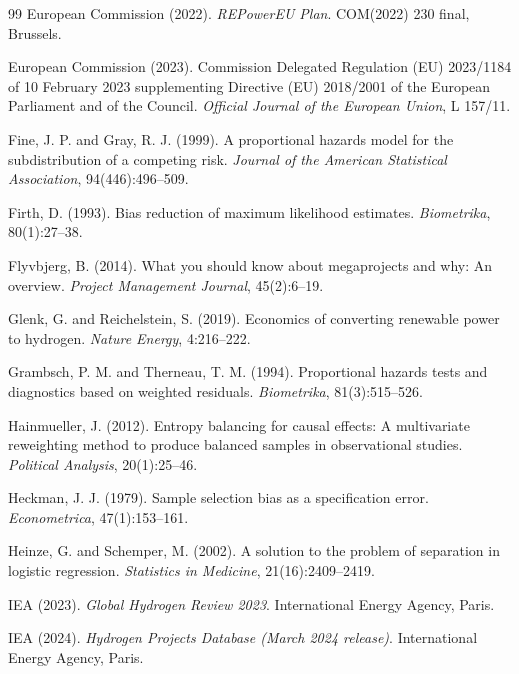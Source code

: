 \documentclass[review,authoryear,11pt]{elsarticle}
\begin{document}
\begin{thebibliography}{99}
European Commission (2022). \textit{REPowerEU Plan}. COM(2022) 230 final, Brussels.

European Commission (2023). Commission Delegated Regulation (EU) 2023/1184 of 10 February 2023 supplementing Directive (EU) 2018/2001 of the European Parliament and of the Council. \textit{Official Journal of the European Union}, L 157/11.

Fine, J. P. and Gray, R. J. (1999). A proportional hazards model for the subdistribution of a competing risk. \textit{Journal of the American Statistical Association}, 94(446):496--509.

Firth, D. (1993). Bias reduction of maximum likelihood estimates. \textit{Biometrika}, 80(1):27--38.

Flyvbjerg, B. (2014). What you should know about megaprojects and why: An overview. \textit{Project Management Journal}, 45(2):6--19.

Glenk, G. and Reichelstein, S. (2019). Economics of converting renewable power to hydrogen. \textit{Nature Energy}, 4:216--222.

Grambsch, P. M. and Therneau, T. M. (1994). Proportional hazards tests and diagnostics based on weighted residuals. \textit{Biometrika}, 81(3):515--526.

Hainmueller, J. (2012). Entropy balancing for causal effects: A multivariate reweighting method to produce balanced samples in observational studies. \textit{Political Analysis}, 20(1):25--46.

Heckman, J. J. (1979). Sample selection bias as a specification error. \textit{Econometrica}, 47(1):153--161.

Heinze, G. and Schemper, M. (2002). A solution to the problem of separation in logistic regression. \textit{Statistics in Medicine}, 21(16):2409--2419.

IEA (2023). \textit{Global Hydrogen Review 2023}. International Energy Agency, Paris.

IEA (2024). \textit{Hydrogen Projects Database (March 2024 release)}. International Energy Agency, Paris.


\end{thebibliography}
\end{document}
